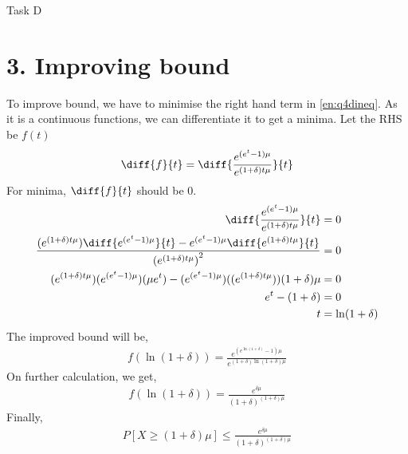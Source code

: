 \begin{task}{Task D}
	\section*{3. Improving bound}
	To improve bound, we have to minimise the right hand term in \ref{en:q4dineq}. As it is a continuous functions, we can differentiate it to get a minima. Let the RHS be $f(t)$
	\begin{align}
		\diff{f}{t} = \diff{\frac{e^{(e^t-1)\mu}}{e^{(1+\delta)t\mu}}}{t}
	\end{align}
	For minima, $\diff{f}{t} $ should be 0.
	\begin{align}
		\diff{\frac{e^{(e^t-1)\mu}}{e^{(1+\delta)t\mu}}}{t}                                                                       & = 0             \\
		\frac{(e^{(1+\delta)t\mu})\diff{e^{(e^t-1)\mu}}{t}- e^{(e^t-1)\mu}\diff{e^{(1+\delta)t\mu}}{t}}{{(e^{(1+\delta)t\mu})}^2} & = 0             \\
		(e^{(1+\delta)t\mu})(e^{(e^t-1)\mu})(\mu e^t) - (e^{(e^t-1)\mu})((e^{(1+\delta)t\mu}))(1+\delta)\mu                       & = 0             \\
		e^t - (1+\delta)                                                                                                          & = 0             \\
		t                                                                                                                         & = \ln(1+\delta)
	\end{align}
	The improved bound will be,
	\begin{align}
		f(\ln(1+\delta)) = \frac{e^{(e^{\ln(1+\delta)}-1)\mu}}{e^{(1+\delta){\ln(1+\delta)}\mu}}
	\end{align}
	On further calculation, we get,
	\begin{align}
		f(\ln(1+\delta)) = \frac{e^{\delta \mu}}{(1+\delta)^{(1+\delta)\mu}}
	\end{align}
	Finally,
	\begin{align}
		P[X\geq (1+\delta)\mu] \leq \frac{e^{\delta \mu}}{(1+\delta)^{(1+\delta)\mu}}
	\end{align}
\end{task}


